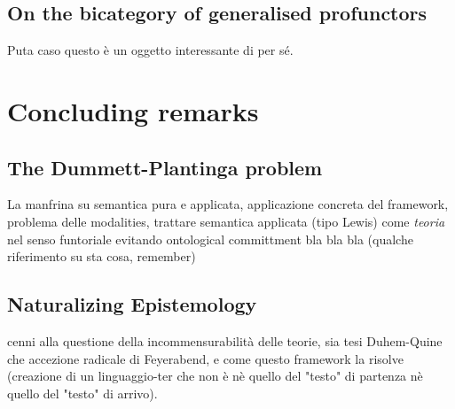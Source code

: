 \documentclass[a4paper]{../birkjour}
\begin{document}
\subsection{On the bicategory of generalised profunctors}
Puta caso questo è un oggetto interessante di per sé.

\section{Concluding remarks}

\subsection{The Dummett-Plantinga problem}
La manfrina su semantica pura e applicata, applicazione concreta del framework, problema delle modalities, trattare semantica applicata (tipo Lewis) come \emph{teoria} nel senso funtoriale evitando ontological committment bla bla bla (qualche riferimento su sta cosa, remember)

\subsection{Naturalizing Epistemology}
cenni alla questione della incommensurabilità delle teorie, sia tesi Duhem-Quine che accezione radicale di Feyerabend, e come questo framework la risolve (creazione di un linguaggio-ter che non è nè quello del "testo" di partenza nè quello del "testo" di arrivo). 
 
{}

\end{document}
